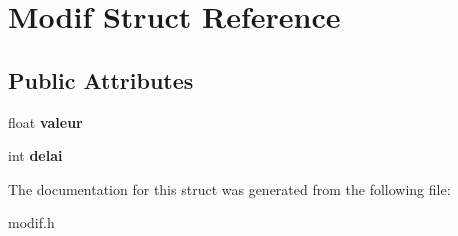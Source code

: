 \hypertarget{structModif}{}\section{Modif Struct Reference}
\label{structModif}
\subsection*{Public Attributes}
\begin{DoxyCompactItemize}
\item 
\mbox{\label{structModif_a187fe7b693f92404e05f7175651cb204}} 
float {\bfseries valeur}
\item 
\mbox{\label{structModif_a5dd96385a38bbd69b61ee9a7e553ea5f}} 
int {\bfseries delai}
\end{DoxyCompactItemize}


The documentation for this struct was generated from the following file\+:\begin{DoxyCompactItemize}
\item 
modif.\+h\end{DoxyCompactItemize}
